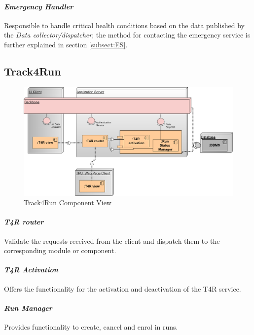 \paragraph{\textit{Emergency Handler}} Responsible to handle critical health conditions based on the data published by the \textit{Data collector/dispatcher}; the method for contacting the emergency service is further explained in section \ref{subsect:ES}.
\subsection{Track4Run}
\label{subsect:T4RComponentView}
\begin{figure}[H]
\caption{Track4Run Component View}
\centering
\includegraphics[width = \textwidth]{sections/architecturalDesign/T4RDiagram.png}
\end{figure}
\paragraph{\textit{T4R router}} Validate the requests received from the client and dispatch them to the corresponding module or component.
\paragraph{\textit{T4R Activation}} Offers the functionality for the activation and deactivation of the T4R service.
\paragraph{\textit{Run Manager}} Provides functionality to create, cancel and enrol in runs.
